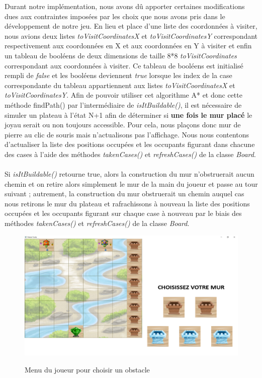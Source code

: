 \documentclass{article}
\begin{document}
Durant notre implémentation, nous avons dû apporter certaines modifications dues aux contraintes imposées par les choix que nous avons pris dans le développement de notre jeu. En lieu et place d'une liste des coordonnées à visiter, nous avions deux listes \textit{toVisitCoordinatesX} et \textit{toVisitCoordinatesY} correspondant respectivement aux coordonnées en X et aux coordonnées en Y à visiter et enfin un tableau de booléens de deux dimensions de taille 8*8 \textit{toVisitCoordinates} correspondant aux coordonnées à visiter. Ce tableau de booléens est initialisé rempli de \textit{false} et les booléens deviennent \textit{true} lorsque les index de la case correspondante du tableau appartiennent aux listes \textit{toVisitCoordinatesX} et \textit{toVisitCoordinatesY}.
\medbreak
Afin de pouvoir utiliser cet algorithme A* et donc cette méthode findPath() par l'intermédiaire de \textit{isItBuildable()}, il est nécessaire de simuler un plateau à l'état N+1 afin de déterminer si \textbf{une fois le mur placé} le joyau serait ou non toujours accessible. Pour cela, nous plaçons donc mur de pierre au clic de souris mais n'actualisons pas l'affichage. Nous nous contentons d'actualiser la liste des positions occupées et les occupants figurant dans chacune des cases à l'aide des méthodes \textit{takenCases()} et \textit{refreshCases()} de la classe \textit{Board}.
\\ \\
\indent Si \textit{isItBuildable()} retourne true, alors la construction du mur n'obstruerait aucun chemin et on retire alors simplement le mur de la main du joueur et passe au tour suivant ; autrement, la construction du mur obstruerait un chemin auquel cas nous retirons le mur du plateau et rafrachissons à nouveau la liste des positions occupées et les occupants figurant sur chaque case à nouveau par le biais des méthodes \textit{takenCases()} et \textit{refreshCases()} de la classe \textit{Board}. 
\medbreak
\begin{figure}[!h]
	\begin{center}
		\includegraphics[scale=0.2]{../img/obstacles} \\
	\end{center}
	\caption{Menu du joueur pour choisir un obstacle}
\end{figure}  
\end{document}

